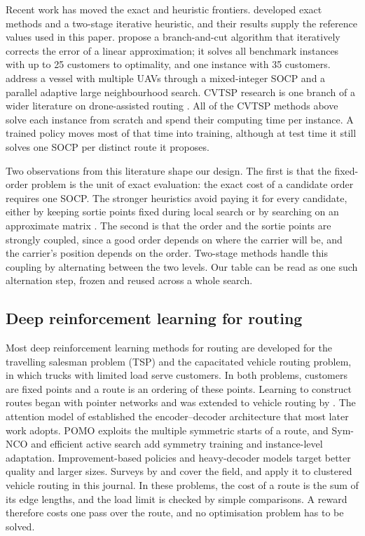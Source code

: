 \documentclass[preprint,12pt,authoryear]{elsarticle}
\begin{document}
Recent work has moved the exact and heuristic frontiers. \citet{li2025} developed exact methods and a two-stage iterative heuristic, and their results supply the reference values used in this paper. \citet{vieira2026} propose a branch-and-cut algorithm that iteratively corrects the error of a linear approximation; it solves all benchmark instances with up to 25 customers to optimality, and one instance with 35 customers. \citet{ren2026} address a vessel with multiple UAVs through a mixed-integer SOCP and a parallel adaptive large neighbourhood search. CVTSP research is one branch of a wider literature on drone-assisted routing \citep{murray2015,agatz2018,otto2018,macrina2020,chung2020}. All of the CVTSP methods above solve each instance from scratch and spend their computing time per instance. A trained policy moves most of that time into training, although at test time it still solves one SOCP per distinct route it proposes.

Two observations from this literature shape our design. The first is that the fixed-order problem is the unit of exact evaluation: the exact cost of a candidate order requires one SOCP. The stronger heuristics avoid paying it for every candidate, either by keeping sortie points fixed during local search \citep{erdogan2021} or by searching on an approximate matrix \citep{li2025}. The second is that the order and the sortie points are strongly coupled, since a good order depends on where the carrier will be, and the carrier's position depends on the order. Two-stage methods handle this coupling by alternating between the two levels. Our table can be read as one such alternation step, frozen and reused across a whole search.

\subsection{Deep reinforcement learning for routing}

Most deep reinforcement learning methods for routing are developed for the travelling salesman problem (TSP) and the capacitated vehicle routing problem, in which trucks with limited load serve customers. In both problems, customers are fixed points and a route is an ordering of these points. Learning to construct routes began with pointer networks \citep{vinyals2015} and was extended to vehicle routing by \citet{nazari2018}. The attention model of \citet{kool2019} established the encoder--decoder architecture that most later work adopts. POMO \citep{kwon2020} exploits the multiple symmetric starts of a route, and Sym-NCO \citep{kim2022} and efficient active search \citep{hottung2022} add symmetry training and instance-level adaptation. Improvement-based policies \citep{wu2022} and heavy-decoder models \citep{luo2023} target better quality and larger sizes. Surveys by \citet{bengio2021} and \citet{mazyavkina2021} cover the field, and \citet{wuy2026} apply it to clustered vehicle routing in this journal. In these problems, the cost of a route is the sum of its edge lengths, and the load limit is checked by simple comparisons. A reward therefore costs one pass over the route, and no optimisation problem has to be solved.
\end{document}
